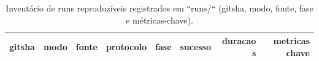 \begin{table}[!htb]
\centering
\caption{Inventário de runs reproduzíveis registrados em ``runs/`` (gitsha, modo, fonte, fase e métricas-chave).}
\label{tab:run-inventory}
\begin{tabular}{lrrrrrrr}
\toprule
gitsha & modo & fonte & protocolo & fase & sucesso & duracao s & metricas chave \\
\midrule
\bottomrule
\end{tabular}
\end{table}
